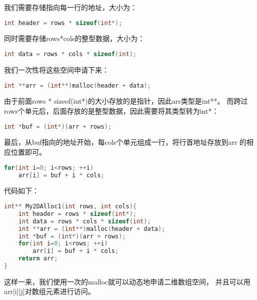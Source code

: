 \begin{description}
我们需要存储指向每一行的地址，大小为：
\begin{lstlisting}[language=C++]
int header = rows * sizeof(int*);
\end{lstlisting}
同时需要存储rows*cols的整型数据，大小为：
\begin{lstlisting}[language=C++]
int data = rows * cols * sizeof(int);
\end{lstlisting}
我们一次性将这些空间申请下来：
\begin{lstlisting}[language=C++]
int **arr = (int**)malloc(header + data);
\end{lstlisting}
由于前面rows * sizeof(int*)的大小存放的是指针，因此arr类型是int**。 而跨过rows个单元后，后面存放的是整型数据，因此需要将其类型转为int*：
\begin{lstlisting}[language=C++]
int *buf = (int*)(arr + rows);
\end{lstlisting}
最后，从buf指向的地址开始，每cols个单元组成一行，将行首地址存放到arr 的相应位置即可。
\begin{lstlisting}[language=C++]
for(int i=0; i<rows; ++i)
    arr[i] = buf + i * cols;
\end{lstlisting}
代码如下：
\begin{lstlisting}[language=C++]
int** My2DAlloc1(int rows, int cols){
    int header = rows * sizeof(int*);
    int data = rows * cols * sizeof(int);
    int **arr = (int**)malloc(header + data);
    int *buf = (int*)(arr + rows);
    for(int i=0; i<rows; ++i)
        arr[i] = buf + i * cols;
    return arr;
}
\end{lstlisting}
这样一来，我们使用一次的malloc就可以动态地申请二维数组空间， 并且可以用arr[i][j]对数组元素进行访问。

%

\end{description}
